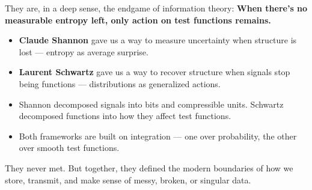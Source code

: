 They are, in a deep sense, the endgame of information theory:  
\textbf{When there’s no measurable entropy left, only action on test functions remains.}

\begin{tcolorbox}[colback=gray!5, colframe=black!60, title={Historical Sidebar: Schwartz vs. Shannon — Two Saviors of Signal Theory}]
\begin{itemize}
    \item \textbf{Claude Shannon} gave us a way to measure uncertainty when structure is lost — entropy as average surprise.
    \item \textbf{Laurent Schwartz} gave us a way to recover structure when signals stop being functions — distributions as generalized actions.
    \item Shannon decomposed signals into bits and compressible units. Schwartz decomposed functions into how they affect test functions.
    \item Both frameworks are built on integration — one over probability, the other over smooth test functions.
\end{itemize}
They never met. But together, they defined the modern boundaries of how we store, transmit, and make sense of messy, broken, or singular data.
\end{tcolorbox}


